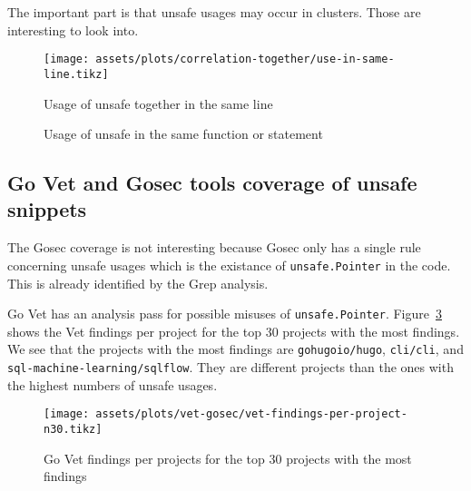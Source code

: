 The important part is that unsafe usages may occur in clusters. Those are interesting to look into.

\begin{figure}[ht]
    \centering
    {\scriptsize \texttt{[image: assets/plots/correlation-together/use-in-same-line.tikz]}}
    \caption{Usage of unsafe together in the same line}
    \label{fig:correlations-unsafe-usage-same-line}
\end{figure}

\begin{figure}[ht]
    \centering
    \caption{Usage of unsafe in the same function or statement}
    \label{fig:correlations-unsafe-usage-same-function-and-statement}
\end{figure}



\subsection{Go Vet and Gosec tools coverage of unsafe snippets}\label{subsec:results-vet-gosec}

The Gosec coverage is not interesting because Gosec only has a single rule concerning unsafe usages which is the
existance of \texttt{unsafe.Pointer} in the code.
This is already identified by the Grep analysis.

Go Vet has an analysis pass for possible misuses of \texttt{unsafe.Pointer}.
Figure~\ref{fig:vet-findings-per-project-n30} shows the Vet findings per project for the top 30 projects with the most
findings.
We see that the projects with the most findings are \texttt{gohugoio/hugo}, \texttt{cli/cli},
and \texttt{sql-machine-learning/sqlflow}.
They are different projects than the ones with the highest numbers of unsafe usages.

\begin{figure}[ht]
    \centering
    {\scriptsize \texttt{[image: assets/plots/vet-gosec/vet-findings-per-project-n30.tikz]}}
    \caption{Go Vet findings per projects for the top 30 projects with the most findings}
    \label{fig:vet-findings-per-project-n30}
\end{figure}

